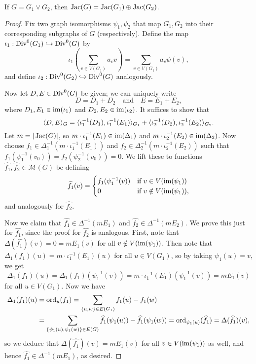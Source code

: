\begin{prop}
If $G = G_1 \vee G_2$, then $\operatorname{Jac}(G)=\operatorname{Jac}(G_1) \oplus \operatorname{Jac}(G_2)$.
\end{prop}
\begin{proof}
Fix two graph isomorphisms $\psi_1, \psi_2$ that map $G_1, G_2$ into their corresponding subgraphs of $G$ (respectively). Define the map $\iota_1: \operatorname{Div}^0(G_1) \hookrightarrow \operatorname{Div}^0(G)$ by
\[
\iota_1 \left(\sum_{v \in V(G_1)}a_v v \right)= \sum_{v \in V(G_1)}a_{v} \psi(v),
\]
and define $\iota_2 : \operatorname{Div}^0(G_2) \hookrightarrow \operatorname{Div}^0(G)$ analogously. 

Now let $D, E \in \operatorname{Div}^0(G)$ be given; we can uniquely write
\[
D = D_1 + D_2 \quad \text{and} \quad E = E_1 + E_2,
\]
where $D_1, E_1 \in \operatorname{im}(\iota_1)$ and $D_2, E_2 \in \operatorname{im}(\iota_2)$. It suffices to show that
\[
\langle D, E \rangle_G = \langle \iota_1^{-1}(D_1), \iota_1^{-1}(E_1) \rangle_{G_1} + \langle \iota_2^{-1}(D_2), \iota_2^{-1}(E_2) \rangle_{G_2}.
\]
Let $m = |\operatorname{Jac}(G)|$, so $m \cdot \iota_1^{-1}(E_1) \in \operatorname{im}(\Delta_1)$ and $m \cdot \iota_2^{-1}(E_2) \in \operatorname{im}(\Delta_2)$. Now choose $f_1 \in \Delta_1^{-1} (m \cdot \iota_1^{-1}(E_1))$ and $f_2 \in \Delta_2^{-1} (m \cdot \iota_2^{-1}(E_2))$ such that $f_1(\psi_1^{-1}(v_0)) = f_2(\psi_2^{-1}(v_0)) = 0$. We lift these to functions $\widehat{f_1}, \widehat{f_2} \in \mathcal{M}(G)$ be defining
\[
\widehat{f_1}(v) =
\begin{cases}
f_1(\psi_1^{-1}(v)) & \text{if $v \in V(\operatorname{im}(\psi_1))$} \\
0 & \text{if $v \notin V(\operatorname{im}(\psi_1))$},
\end{cases}
\]
and analogously for $\widehat{f_2}$.

Now we claim that $\widehat{f_1} \in \Delta^{-1}(mE_1)$ and $\widehat{f_2} \in \Delta^{-1}(mE_2)$. We prove this just for $\widehat{f_1}$, since the proof for $\widehat{f_2}$ is analogous. First, note that $\Delta(\widehat{f_1})(v)=0=mE_1(v)$ for all $v \notin V(\operatorname{im}(\psi_1))$. Then note that $\Delta_1(f_1)(u) = m \cdot \iota_1^{-1}(E_1)(u)$ for all $u \in V(G_1)$, so by taking $\psi_1(u)=v$, we get
\[
\Delta_1(f_1)(u) = \Delta_1(f_1)(\psi_1^{-1}(v)) = m \cdot \iota_1^{-1}(E_1)(\psi_1^{-1}(v)) = mE_1(v)
\]
for all $u \in V(G_1)$. Now we have
\begin{align*}
\Delta_1(f_1)(u) &= \operatorname{ord}_{u}(f_1) = \sum_{\{u,w\} \in E(G_1)} f_1(u) - f_1(w) \\
&= \sum_{\{\psi_1(u),\psi_1(w)\} \in E(G)} \widehat{f_1}(\psi_1(u)) - \widehat{f_1}(\psi_1(w)) = \operatorname{ord}_{\psi_1(u)}(\widehat{f_1}) = \Delta(\widehat{f_1})(v),
\end{align*}
so we deduce that $\Delta(\widehat{f_1})(v)=mE_1(v)$ for all $v\in V(\operatorname{im}(\psi_1))$ as well, and hence $\widehat{f_1}\in\Delta^{-1}(mE_1)$, as desired.


\end{proof}
